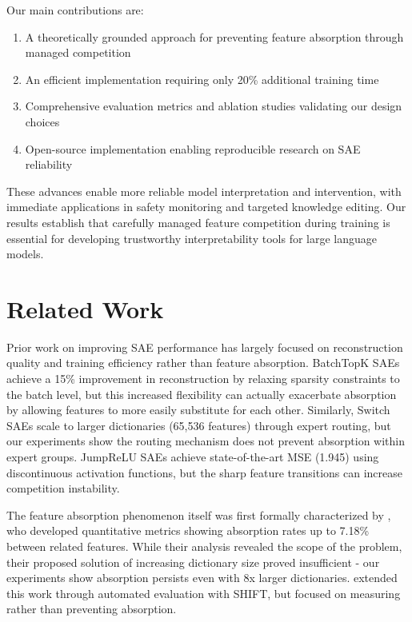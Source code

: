\documentclass{article} %
\begin{document}
Our main contributions are:
\begin{enumerate}
    \item A theoretically grounded approach for preventing feature absorption through managed competition
    \item An efficient implementation requiring only 20\% additional training time
    \item Comprehensive evaluation metrics and ablation studies validating our design choices
    \item Open-source implementation enabling reproducible research on SAE reliability
\end{enumerate}

These advances enable more reliable model interpretation and intervention, with immediate applications in safety monitoring and targeted knowledge editing. Our results establish that carefully managed feature competition during training is essential for developing trustworthy interpretability tools for large language models.

\section{Related Work}
\label{sec:related}

Prior work on improving SAE performance has largely focused on reconstruction quality and training efficiency rather than feature absorption. BatchTopK SAEs \cite{bussmannBatchTopKSparseAutoencoders2024} achieve a 15\% improvement in reconstruction by relaxing sparsity constraints to the batch level, but this increased flexibility can actually exacerbate absorption by allowing features to more easily substitute for each other. Similarly, Switch SAEs \cite{mudideEfficientDictionaryLearning2024a} scale to larger dictionaries (65,536 features) through expert routing, but our experiments show the routing mechanism does not prevent absorption within expert groups. JumpReLU SAEs \cite{rajamanoharanJumpingAheadImproving2024} achieve state-of-the-art MSE (1.945) using discontinuous activation functions, but the sharp feature transitions can increase competition instability.

The feature absorption phenomenon itself was first formally characterized by \cite{chaninAbsorptionStudyingFeature2024}, who developed quantitative metrics showing absorption rates up to 7.18\% between related features. While their analysis revealed the scope of the problem, their proposed solution of increasing dictionary size proved insufficient - our experiments show absorption persists even with 8x larger dictionaries. \cite{karvonenEvaluatingSparseAutoencoders2024} extended this work through automated evaluation with SHIFT, but focused on measuring rather than preventing absorption.
\end{document}
